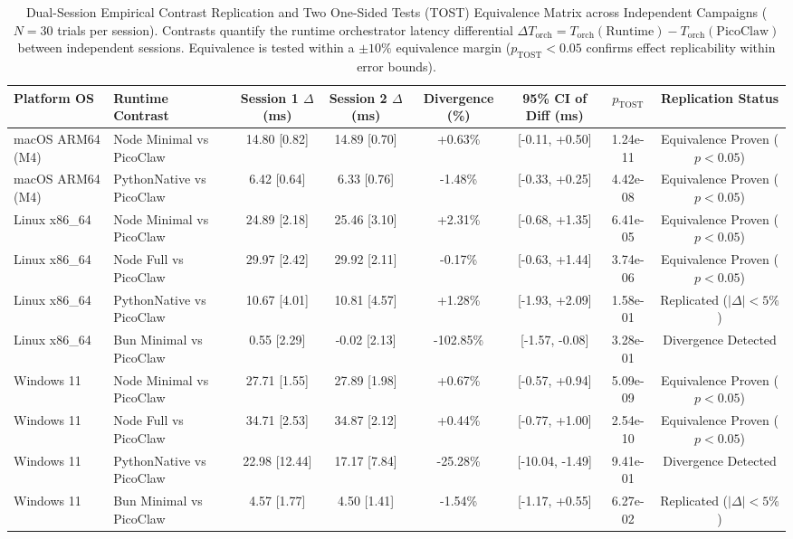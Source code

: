 \begin{table}[t]
\small
\centering
\caption{Dual-Session Empirical Contrast Replication and Two One-Sided Tests (TOST) Equivalence Matrix across Independent Campaigns ($N=30$ trials per session). Contrasts quantify the runtime orchestrator latency differential $\Delta T_{\text{orch}} = T_{\text{orch}}(\text{Runtime}) - T_{\text{orch}}(\text{PicoClaw})$ between independent sessions. Equivalence is tested within a $\pm 10\%$ equivalence margin ($p_{\text{TOST}} < 0.05$ confirms effect replicability within error bounds).}
\label{tab:session_replication_tost}
\begin{tabular}{llcccccc}
\toprule
\textbf{Platform OS} & \textbf{Runtime Contrast} & \textbf{Session 1 $\Delta$ (ms)} & \textbf{Session 2 $\Delta$ (ms)} & \textbf{Divergence (\%)} & \textbf{95\% CI of Diff (ms)} & \textbf{$p_{\text{TOST}}$} & \textbf{Replication Status} \\
\midrule
macOS ARM64 (M4) & Node Minimal vs PicoClaw & 14.80 [0.82] & 14.89 [0.70] & +0.63\% & [-0.11, +0.50] & 1.24e-11 & Equivalence Proven ($p < 0.05$) \\
macOS ARM64 (M4) & PythonNative vs PicoClaw & 6.42 [0.64] & 6.33 [0.76] & -1.48\% & [-0.33, +0.25] & 4.42e-08 & Equivalence Proven ($p < 0.05$) \\
Linux x86_64 & Node Minimal vs PicoClaw & 24.89 [2.18] & 25.46 [3.10] & +2.31\% & [-0.68, +1.35] & 6.41e-05 & Equivalence Proven ($p < 0.05$) \\
Linux x86_64 & Node Full vs PicoClaw & 29.97 [2.42] & 29.92 [2.11] & -0.17\% & [-0.63, +1.44] & 3.74e-06 & Equivalence Proven ($p < 0.05$) \\
Linux x86_64 & PythonNative vs PicoClaw & 10.67 [4.01] & 10.81 [4.57] & +1.28\% & [-1.93, +2.09] & 1.58e-01 & Replicated ($|\Delta| < 5\%$) \\
Linux x86_64 & Bun Minimal vs PicoClaw & 0.55 [2.29] & -0.02 [2.13] & -102.85\% & [-1.57, -0.08] & 3.28e-01 & Divergence Detected \\
Windows 11 & Node Minimal vs PicoClaw & 27.71 [1.55] & 27.89 [1.98] & +0.67\% & [-0.57, +0.94] & 5.09e-09 & Equivalence Proven ($p < 0.05$) \\
Windows 11 & Node Full vs PicoClaw & 34.71 [2.53] & 34.87 [2.12] & +0.44\% & [-0.77, +1.00] & 2.54e-10 & Equivalence Proven ($p < 0.05$) \\
Windows 11 & PythonNative vs PicoClaw & 22.98 [12.44] & 17.17 [7.84] & -25.28\% & [-10.04, -1.49] & 9.41e-01 & Divergence Detected \\
Windows 11 & Bun Minimal vs PicoClaw & 4.57 [1.77] & 4.50 [1.41] & -1.54\% & [-1.17, +0.55] & 6.27e-02 & Replicated ($|\Delta| < 5\%$) \\
\bottomrule
\end{tabular}
\end{table}
